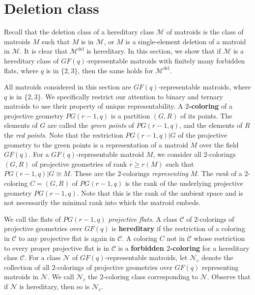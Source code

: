 \documentclass[11pt]{amsart}
\theoremstyle{definition}
\theoremstyle{remark}
\numberwithin{equation}{section}
\newcommand\Md{\mathcal{M}^\mathrm{del}}
\begin{document}
\section{Deletion class}

Recall that the deletion class of a hereditary class $\mathcal{M}$ of matroids is the class of matroids $M$ such that $M$ is in $\mathcal{M}$, or $M$ is a single-element deletion of a matroid in $\mathcal{M}$. It is clear that $\Md$ is hereditary. In this section, we show that if $\mathcal{M}$ is a hereditary class of $GF(q)$-representable matroids with finitely many forbidden flats, where $q$ is in $\{2, 3\}$, then the same holds for $\Md$. 

All matroids considered in this section are $GF(q)$-representable matroids, where $q$ is in $\{2, 3\}$. We specifically restrict our attention to binary and ternary matroids to use their property of unique representability. A \textbf{$2$-coloring} of a projective geometry $PG(r-1,q)$ is a partition $(G,R)$ of its points. The elements of $G$ are called the \textit{green points} of $PG(r-1,q)$, and the elements of $R$ the \textit{red points}. Note that the restriction $PG(r-1,q)|G$ of the projective geometry to the green points is a representation of a matroid $M$ over the field $GF(q)$. For a $GF(q)$-representable matroid $M$, we consider all $2$-colorings $(G,R)$ of projective geometries of rank $r \ge r(M)$ such that $PG(r-1,q)|G \cong M$. These are the $2$-colorings \textit{representing} $M$. The \textit{rank} of a $2$-coloring $C=(G,R)$ of $PG(r-1,q)$ is the rank of the underlying projective geometry $PG(r-1,q)$. Note that this is the rank of the ambient space and is not necessarily the minimal rank into which the matroid embeds.

We call the flats of $PG(r-1,q)$ \textit{projective flats}. A class $\mathcal{C}$ of $2$-colorings of projective geometries over $GF(q)$ is \textbf{hereditary} if the restriction of a coloring in $\mathcal{C}$ to any projective flat is again in $\mathcal{C}$. A coloring $C$ not in $\mathcal{C}$ whose restriction to every proper projective flat is in $\mathcal{C}$ is a \textbf{forbidden $2$-coloring} for a hereditary class $\mathcal{C}$.
 For a class $\mathcal{N}$ of $GF(q)$-representable matroids, let $\mathcal{N}_c$ denote the collection of all $2$-colorings of projective geometries over $GF(q)$ representing matroids in $\mathcal{N}$. We call $\mathcal{N}_c$ the $2$-coloring class corresponding to $\mathcal{N}$. Observe that if $\mathcal{N}$ is hereditary, then so is $\mathcal{N}_c$.
\end{document}
